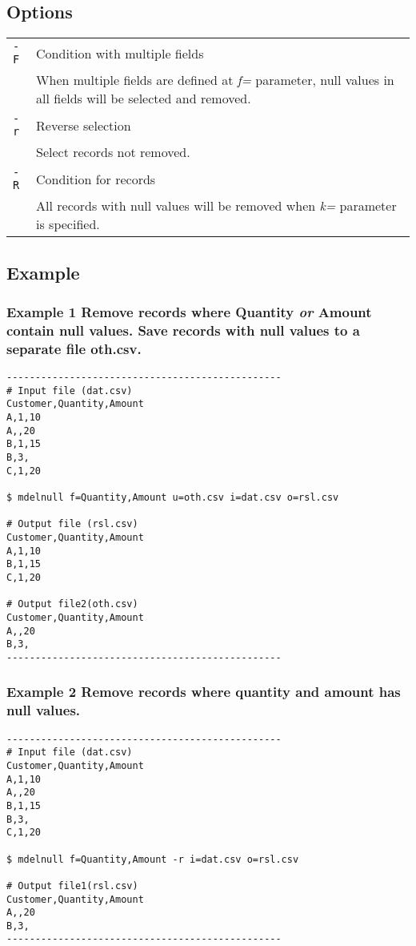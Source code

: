 \documentclass[a4paper]{jarticle}
\begin{document}
\subsection*{Options}
\begin{table}[htbp]
{\small
\begin{tabular}{ll}
\verb|-F|    & Condition with multiple fields\\
& When multiple fields are defined at \emph{f=} parameter, null values in all fields will be selected and removed. \\
\verb|-r|    & Reverse selection \\
& Select records not removed. \\
\verb|-R|    & Condition for records \\
& All records with null values will be removed when \emph{k=} parameter is specified. \\
\end{tabular} 
}
\end{table} 

\subsection*{Example}
\subsubsection*{Example 1 Remove records where Quantity \emph{or} Amount contain null values. Save records with null values to a separate file oth.csv. 
}

\begin{verbatim}
------------------------------------------------
# Input file (dat.csv)
Customer,Quantity,Amount
A,1,10
A,,20
B,1,15
B,3,
C,1,20

$ mdelnull f=Quantity,Amount u=oth.csv i=dat.csv o=rsl.csv

# Output file (rsl.csv)
Customer,Quantity,Amount
A,1,10
B,1,15
C,1,20

# Output file2(oth.csv)
Customer,Quantity,Amount
A,,20
B,3,
------------------------------------------------
\end{verbatim}

\subsubsection*{Example 2 Remove records where quantity and amount has null values. 
}

\begin{verbatim}
------------------------------------------------
# Input file (dat.csv)
Customer,Quantity,Amount
A,1,10
A,,20
B,1,15
B,3,
C,1,20

$ mdelnull f=Quantity,Amount -r i=dat.csv o=rsl.csv

# Output file1(rsl.csv)
Customer,Quantity,Amount
A,,20
B,3,
------------------------------------------------
\end{verbatim}
\end{document}
